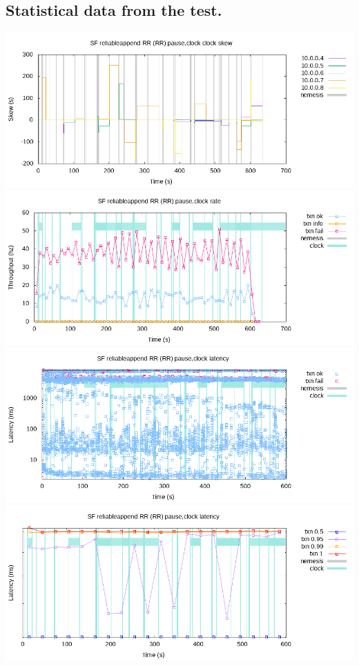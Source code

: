 \documentclass[a4paper,10pt,titlepage]{report}
\begin{document}
\subsection{Statistical data from the test.}
\includegraphics[scale=0.5]{Report/results/clock-skew.png}
\\
\includegraphics[scale=0.5]{Report/results/rate.png}
\\
\includegraphics[scale=0.5]{Report/results/latency-raw.png}
\\
\includegraphics[scale=0.5]{Report/results/latency-quantiles.png}
\end{document}
